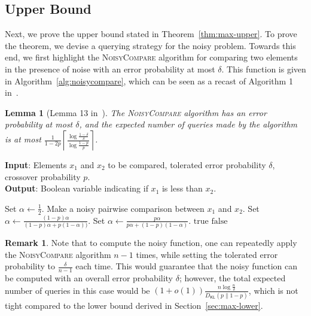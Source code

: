 \documentclass[journal, onecolumn]{IEEEtran}
\theoremstyle{plain}
\newtheorem{lemma}[theorem]{Lemma}
\theoremstyle{definition}
\newtheorem{remark}{Remark}[section]
\theoremstyle{remark}
\begin{document}
\subsection{Upper Bound} \label{sec:max-upper}
Next, we prove the upper bound stated in Theorem~\ref{thm:max-upper}. To prove the theorem, we devise a querying strategy for the noisy \maxn problem. Towards this end, we first highlight the \textsc{NoisyCompare} algorithm for comparing two elements in the presence of noise with an error probability at most $\delta$. This function is given in Algorithm~\ref{alg:noisycompare}, which can be seen as a recast of Algorithm 1 in~\citep{Gu-Xu2023}. 

\begin{lemma}[Lemma 13 in~\citep{Gu-Xu2023}] \label{lemma:noisy-compare}
    The \textsc{NoisyCompare} algorithm has an error probability at most $\delta$, and the expected number of queries made by the algorithm is at most 
       $ \frac{1}{1-2p}\left\lceil\frac{\log\frac{1-\delta}{\delta}}{\log\frac{1-p}{p}}\right\rceil$.
\end{lemma}

\begin{algorithm}[t]%
\caption{\textsc{NoisyCompare} for comparing two elements in the presence of noise} \label{alg:noisycompare}
\textbf{Input}: Elements $x_1$ and $x_2$ to be compared, tolerated error probability $\delta$, crossover probability $p$.\\
\textbf{Output}: Boolean variable indicating if $x_1$ is less than $x_2$.
\begin{algorithmic}[1]
    \State Set $\alpha \gets \frac12$.
        \State Make a noisy pairwise comparison between $x_1$ and $x_2$.
            \State Set $\alpha\gets \frac{(1-p)\alpha}{(1-p)\alpha+p(1-\alpha))}$.
        \Else
            \State Set $\alpha\gets \frac{p\alpha}{p\alpha+(1-p)(1-\alpha)}$.
        \EndIf
        \State \Return $\mathrm{true}$
        \EndIf
        \If{$\alpha\le \delta$}
        \State \Return $\mathrm{false}$
        \EndIf
    \EndWhile
\end{algorithmic}
\end{algorithm}

\begin{remark}
    Note that to compute the noisy \maxn function, one can repeatedly apply the \textsc{NoisyCompare} algorithm $n-1$ times, while setting the tolerated error probability to $\frac{\delta}{n-1}$ each time. This would guarantee that the noisy \maxn function can be computed with an overall error probability $\delta$; however, the total expected number of queries in this case would be $(1 + o(1)) \frac{n\log \frac{n}{\delta}}{D_{\mathsf{KL}}(p \| 1-p)}$, which is not tight compared to the lower bound derived in Section~\ref{sec:max-lower}.
\end{remark}
\end{document}
